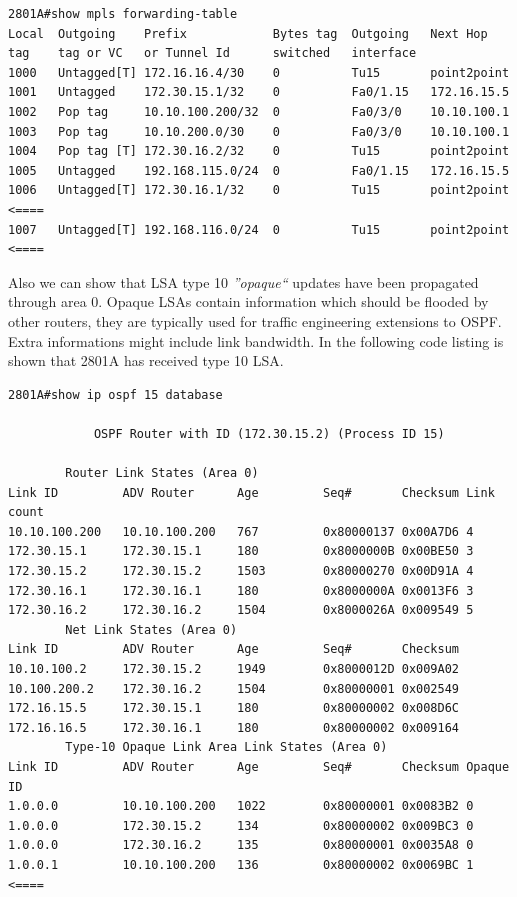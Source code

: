 \documentclass{llncs}
\begin{document}
\begin{lstlisting}
2801A#show mpls forwarding-table 
Local  Outgoing    Prefix            Bytes tag  Outgoing   Next Hop    
tag    tag or VC   or Tunnel Id      switched   interface              
1000   Untagged[T] 172.16.16.4/30    0          Tu15       point2point  
1001   Untagged    172.30.15.1/32    0          Fa0/1.15   172.16.15.5  
1002   Pop tag     10.10.100.200/32  0          Fa0/3/0    10.10.100.1  
1003   Pop tag     10.10.200.0/30    0          Fa0/3/0    10.10.100.1  
1004   Pop tag [T] 172.30.16.2/32    0          Tu15       point2point  
1005   Untagged    192.168.115.0/24  0          Fa0/1.15   172.16.15.5  
1006   Untagged[T] 172.30.16.1/32    0          Tu15       point2point  <====
1007   Untagged[T] 192.168.116.0/24  0          Tu15       point2point  <====
\end{lstlisting}

Also we can show that LSA type 10 \emph{''opaque``} updates have been propagated through area 0. 
Opaque LSAs contain information which should be flooded by other routers, they are typically used for traffic engineering extensions to OSPF. Extra informations might include link bandwidth. In the following code listing is shown that 2801A has received type 10 LSA.
\\
\lstset{language=sh, caption=2801A OSPF database with type 10 LSA, basicstyle=\ttfamily\scriptsize , breaklines=true}
\begin{lstlisting}
2801A#show ip ospf 15 database 

            OSPF Router with ID (172.30.15.2) (Process ID 15)

		Router Link States (Area 0)
Link ID         ADV Router      Age         Seq#       Checksum Link count
10.10.100.200   10.10.100.200   767         0x80000137 0x00A7D6 4
172.30.15.1     172.30.15.1     180         0x8000000B 0x00BE50 3
172.30.15.2     172.30.15.2     1503        0x80000270 0x00D91A 4
172.30.16.1     172.30.16.1     180         0x8000000A 0x0013F6 3
172.30.16.2     172.30.16.2     1504        0x8000026A 0x009549 5
		Net Link States (Area 0)
Link ID         ADV Router      Age         Seq#       Checksum
10.10.100.2     172.30.15.2     1949        0x8000012D 0x009A02
10.100.200.2    172.30.16.2     1504        0x80000001 0x002549
172.16.15.5     172.30.15.1     180         0x80000002 0x008D6C
172.16.16.5     172.30.16.1     180         0x80000002 0x009164
		Type-10 Opaque Link Area Link States (Area 0)
Link ID         ADV Router      Age         Seq#       Checksum Opaque ID
1.0.0.0         10.10.100.200   1022        0x80000001 0x0083B2 0       
1.0.0.0         172.30.15.2     134         0x80000002 0x009BC3 0       
1.0.0.0         172.30.16.2     135         0x80000001 0x0035A8 0       
1.0.0.1         10.10.100.200   136         0x80000002 0x0069BC 1	<====
\end{lstlisting}
\end{document}

